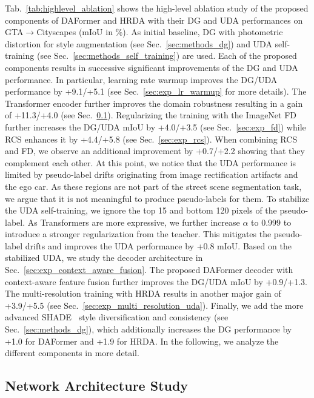 \documentclass[journal,compsoc]{IEEEtran}
\begin{document}
Tab.~\ref{tab:highlevel_ablation} shows the high-level ablation study of the proposed components of DAFormer and HRDA with their DG and UDA performances on GTA$\to$Cityscapes (mIoU in \%). As initial baseline, DG with photometric distortion for style augmentation (see Sec.~\ref{sec:methods_dg}) and UDA self-training (see Sec.~\ref{sec:methods_self_training}) are used.
Each of the proposed components results in successive significant improvements of the DG and UDA performance. In particular, learning rate warmup improves the DG/UDA performance by +9.1/+5.1 (see Sec.~\ref{sec:exp_lr_warmup} for more details). The Transformer encoder further improves the domain robustness resulting in a gain of +11.3/+4.0 (see Sec.~\ref{sec:exp_comparison_networks}). Regularizing the training with the ImageNet FD further increases the DG/UDA mIoU by +4.0/+3.5 (see Sec.~\ref{sec:exp_fd}) while RCS enhances it by +4.4/+5.8 (see Sec.~\ref{sec:exp_rcs}). When combining RCS and FD, we observe an additional improvement by +0.7/+2.2 showing that they complement each other. At this point, we notice that the UDA performance is limited by pseudo-label drifts originating from image rectification artifacts and the ego car. As these regions are not part of the street scene segmentation task, we argue that it is not meaningful to produce pseudo-labels for them. 
To stabilize the UDA self-training, we ignore the top 15 and bottom 120 pixels of the pseudo-label. As Transformers are more expressive, we further increase $\alpha$ to 0.999 to introduce a stronger regularization from the teacher. This mitigates the pseudo-label drifts and improves the UDA performance by +0.8 mIoU. Based on the stabilized UDA, we study the decoder architecture in Sec.~\ref{sec:exp_context_aware_fusion}. The proposed DAFormer decoder with context-aware feature fusion further improves the DG/UDA mIoU by +0.9/+1.3. The multi-resolution training with HRDA results in another major gain of +3.9/+5.5 (see Sec.~\ref{sec:exp_multi_resolution_uda}). 
Finally, we add the more advanced SHADE~\cite{zhao2022style} style diversification and consistency (see Sec.~\ref{sec:methods_dg}), which additionally increases the DG performance by +1.0 for DAFormer and +1.9 for HRDA.
In the following, we analyze the different components in more detail.

\subsection{Network Architecture Study}
\label{sec:exp_comparison_networks}
\end{document}
